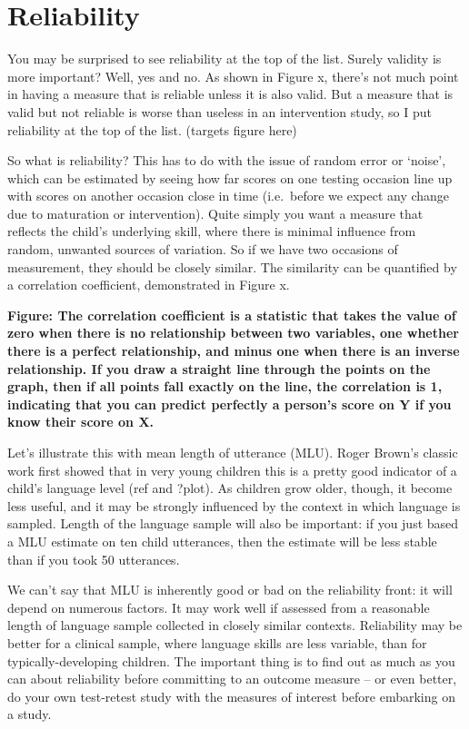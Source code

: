 \documentclass[]{book}
\begin{document}
\hypertarget{reliability}{%
\section{Reliability}\label{reliability}}

You may be surprised to see reliability at the top of the list. Surely validity is more important? Well, yes and no. As shown in Figure x, there's not much point in having a measure that is reliable unless it is also valid. But a measure that is valid but not reliable is worse than useless in an intervention study, so I put reliability at the top of the list.
(targets figure here)

So what is reliability? This has to do with the issue of random error or `noise', which can be estimated by seeing how far scores on one testing occasion line up with scores on another occasion close in time (i.e.~before we expect any change due to maturation or intervention). Quite simply you want a measure that reflects the child's underlying skill, where there is minimal influence from random, unwanted sources of variation. So if we have two occasions of measurement, they should be closely similar. The similarity can be quantified by a correlation coefficient, demonstrated in Figure x.

\textbf{Figure: The correlation coefficient is a statistic that takes the value of zero when there is no relationship between two variables, one whether there is a perfect relationship, and minus one when there is an inverse relationship. If you draw a straight line through the points on the graph, then if all points fall exactly on the line, the correlation is 1, indicating that you can predict perfectly a person's score on Y if you know their score on X.}

Let's illustrate this with mean length of utterance (MLU). Roger Brown's classic work first showed that in very young children this is a pretty good indicator of a child's language level (ref and ?plot). As children grow older, though, it become less useful, and it may be strongly influenced by the context in which language is sampled. Length of the language sample will also be important: if you just based a MLU estimate on ten child utterances, then the estimate will be less stable than if you took 50 utterances.

We can't say that MLU is inherently good or bad on the reliability front: it will depend on numerous factors. It may work well if assessed from a reasonable length of language sample collected in closely similar contexts. Reliability may be better for a clinical sample, where language skills are less variable, than for typically-developing children. The important thing is to find out as much as you can about reliability before committing to an outcome measure -- or even better, do your own test-retest study with the measures of interest before embarking on a study.
\end{document}
